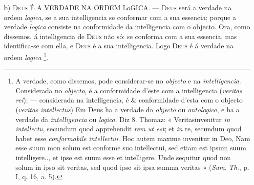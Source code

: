 b) \textsc{Deus} É A VERDADE NA ORDEM LoGICA. --- \textsc{Deus} será a verdade na ordem \emph{logica}, se a sua intelligencia se conformar com a sua essencia; porque a verdade \emph{logica} consiste na conformidade da intelligencia com o objecto. Ora, como dissemos, á intelligencia de \textsc{Deus} não só: se conforma com a sua essencia, mas identifica-se com ella, e \textsc{Deus} é a sua intelligencia. Logo \textsc{Deus} é á verdade na ordem \emph{logica} \footnote{A verdade, como dissemos, pode considerar-se no \emph{objecto} e na \emph{intelligencia}. Considerada no \emph{objecto}, é a conformidade d'este com a intelligencia (\emph{veritas rei}); --- considerada na intelligencia, é \& conformidade d'esta com o objecto (\emph{veritas intellectus}) Em Deus ha a verdade do \emph{objecto} ou \emph{ontologica}, e ha a verdade da \emph{intelligencia} ou \emph{logica}. Diz 8. Thomaz: « Veritasinvenitur \emph{in intellectu}, secundum quod apprehendit \emph{rem ut est}; et \emph{in} re, secundum quod habet esse \emph{conformabile intellectui}. Hoc autem maxime invenitur in Deo, Nam esse suum mon solum est conforme suo intellectui, sed etiam est ipsum suum intelligere.., et ipse est suum esse et intelligere. Unde sequitur quod non solum in ipso sit veritas, sed quod ipse sit ipsa summa veritas » (\emph{Sum}. \emph{Th}., p. I, q. 16, a. 5). \textbar{}}.

